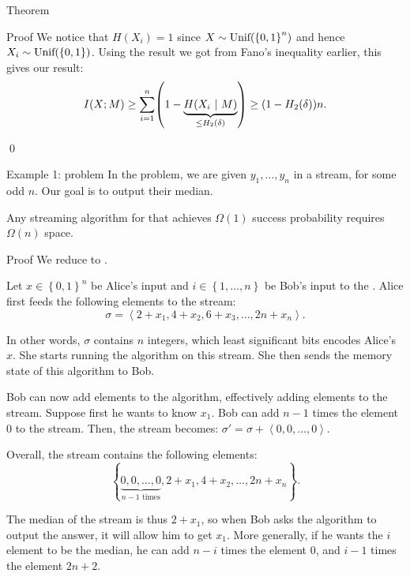 \documentclass[a4paper]{article}
\begin{document}
\begin{parag}{Theorem}
\begin{subparag}{Proof}
        We notice that $H\left(X_i\right) = 1$ since $X \followsdistr \text{Unif}\left(\left\{0, 1\right\}^n\right)$ and hence $X_i \followsdistr \text{Unif}\left(\left\{0, 1\right\}\right)$. Using the result we got from Fano's inequality earlier, this gives our result:
        \[I\left(X; M\right) \geq \sum_{i=1}^{n} \left(1 - \underbrace{H\left(X_i \suchthat M\right)}_{\leq H_2\left(\delta\right)}\right) \geq \left(1 - H_2\left(\delta\right)\right)n.\]

        \qed
    \end{subparag}
\end{parag}

\begin{parag}{Example 1:  problem}
    In the  problem, we are given $y_1, \ldots, y_n$ in a stream, for some odd $n$. Our goal is to output their median.

    Any streaming algorithm for  that achieves $\Omega\left(1\right)$ success probability requires $\Omega\left(n\right)$ space.

    \begin{subparag}{Proof}
        We reduce  to . 

        Let $x \in \left\{0, 1\right\}^n$ be Alice's input and $i \in \left\{1, \ldots, n\right\}$ be Bob's input to the . Alice first feeds the following elements to the stream: 
        \[\sigma = \left\langle 2 + x_1, 4 + x_2, 6 + x_3, \ldots, 2n + x_n \right\rangle.\]
        
        In other words, $\sigma$ contains $n$ integers, which least significant bits encodes Alice's $x$. She starts running the  algorithm on this stream. She then sends the memory state of this algorithm to Bob.  

        Bob can now add elements to the algorithm, effectively adding elements to the stream. Suppose first he wants to know $x_1$. Bob can add $n-1$ times the element $0$ to the stream. Then, the stream becomes:
        $\sigma' = \sigma + \left\langle 0, 0, \ldots, 0 \right\rangle.$

        Overall, the stream contains the following elements: 
        \[\left\{\underbrace{0, 0, \ldots, 0}_{\text{$n - 1$ times}}, 2 + x_1, 4 + x_2, \ldots, 2n + x_n\right\}.\]
        
        The median of the stream is thus $2 + x_1$, so when Bob asks the algorithm to output the answer, it will allow him to get $x_1$. More generally, if he wants the $i$\Th element to be the median, he can add $n-i$ times the element $0$, and $i-1$ times the element $2n + 2$. 


\end{subparag}
\end{parag}
\end{document}

